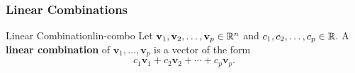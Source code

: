 \begin{center}
\end{center}

\subsubsection{Linear Combinations}

\begin{definition}{Linear Combination}{lin-combo}
  Let $\mathbf{v}_1, \mathbf{v}_2, \ldots, \mathbf{v}_p \in \mathbb{R}^n$ and $c_1, c_2, \ldots, c_p \in \mathbb{R}$. A \textbf{linear combination} of $\mathbf{v}_1, \ldots, \mathbf{v}_p$ is a vector of the form
  \[
    c_1 \mathbf{v}_1 + c_2 \mathbf{v}_2 + \cdots + c_p \mathbf{v}_p.
  \]
\end{definition}

